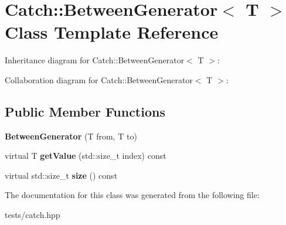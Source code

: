 \hypertarget{class_catch_1_1_between_generator}{}\section{Catch\+:\+:Between\+Generator$<$ T $>$ Class Template Reference}
\label{class_catch_1_1_between_generator}


Inheritance diagram for Catch\+:\+:Between\+Generator$<$ T $>$\+:


Collaboration diagram for Catch\+:\+:Between\+Generator$<$ T $>$\+:
\subsection*{Public Member Functions}
\begin{DoxyCompactItemize}
\item 
\mbox{\label{class_catch_1_1_between_generator_a835a057d691ae37caef660624099b51c}} 
{\bfseries Between\+Generator} (T from, T to)
\item 
\mbox{\label{class_catch_1_1_between_generator_a913f74bb0c23b3bc0127abfffdabbd94}} 
virtual T {\bfseries get\+Value} (std\+::size\+\_\+t index) const
\item 
\mbox{\label{class_catch_1_1_between_generator_af65a1fe51f9b1106fc676e3dd189adb6}} 
virtual std\+::size\+\_\+t {\bfseries size} () const
\end{DoxyCompactItemize}


The documentation for this class was generated from the following file\+:\begin{DoxyCompactItemize}
\item 
tests/catch.\+hpp\end{DoxyCompactItemize}
